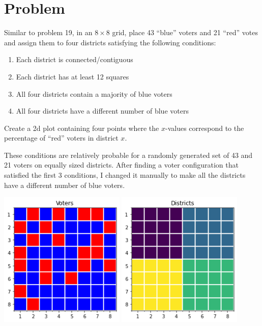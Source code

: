 \documentclass[12pt]{article}
\numberwithin{equation}{section}
\begin{document}
    \section{Problem}
    Similar to problem 19, in an $8\times8$ grid, place 43 ``blue'' voters and 21 ``red'' votes and assign them to four districts satisfying the following conditions:
    \begin{enumerate}
        \item Each district is connected/contiguous
        \item Each district has at least 12 squares
        \item All four districts contain a majority of blue voters
        \item All four districts have a different number of blue voters
    \end{enumerate}
    Create a 2d plot containing four points where the $x$-values correspond to the percentage of ``red'' voters in district $x$.

    These conditions are relatively probable for a randomly generated set of 43 and 21 voters on equally sized districts. After finding a voter configuration that satisfied the first 3 conditions, I changed it manually to make all the districts have a different number of blue voters.

    \includegraphics[width=0.45\textwidth]{figures/voters20.png}
    \includegraphics[width=0.45\textwidth]{figures/districts20.png}
\end{document}
